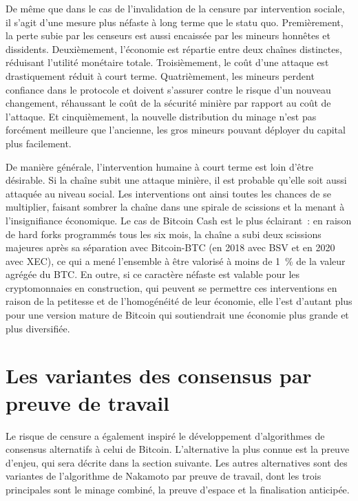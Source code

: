 De même que dans le cas de l'invalidation de la censure par intervention sociale, il s'agit d'une mesure plus néfaste à long terme que le statu quo. Premièrement, la perte subie par les censeurs est aussi encaissée par les mineurs honnêtes et dissidents. Deuxièmement, l'économie est répartie entre deux chaînes distinctes, réduisant l'utilité monétaire totale. Troisièmement, le coût d'une attaque est drastiquement réduit à court terme. Quatrièmement, les mineurs perdent confiance dans le protocole et doivent s'assurer contre le risque d'un nouveau changement, réhaussant le coût de la sécurité minière par rapport au coût de l'attaque. Et cinquièmement, la nouvelle distribution du minage n'est pas forcément meilleure que l'ancienne, les gros mineurs pouvant déployer du capital plus facilement.

De manière générale, l'intervention humaine à court terme est loin d'être désirable. Si la chaîne subit une attaque minière, il est probable qu'elle soit aussi attaquée au niveau social. Les interventions ont ainsi toutes les chances de se multiplier, faisant sombrer la chaîne dans une spirale de scissions et la menant à l'insignifiance économique. Le cas de Bitcoin Cash est le plus éclairant~: en raison de hard forks programmés tous les six mois, la chaîne a subi deux scissions majeures après sa séparation avec Bitcoin-BTC (en 2018 avec BSV et en 2020 avec XEC), ce qui a mené l'ensemble à être valorisé à moins de 1~\% de la valeur agrégée du BTC. En outre, si ce caractère néfaste est valable pour les cryptomonnaies en construction, qui peuvent se permettre ces interventions en raison de la petitesse et de l'homogénéité de leur économie, elle l'est d'autant plus pour une version mature de Bitcoin qui soutiendrait une économie plus grande et plus diversifiée.

\section*{Les variantes des consensus par preuve de travail}

Le risque de censure a également inspiré le développement d'algorithmes de consensus alternatifs à celui de Bitcoin. L'alternative la plus connue est la preuve d'enjeu, qui sera décrite dans la section suivante. Les autres alternatives sont des variantes de l'algorithme de Nakamoto par preuve de travail, dont les trois principales sont le minage combiné, la preuve d'espace et la finalisation anticipée. %

